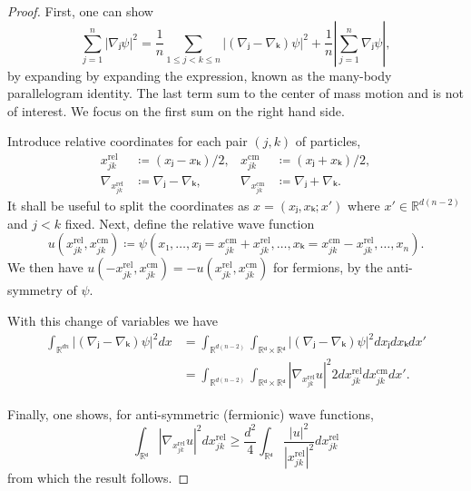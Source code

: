 \begin{proof}
  First, one can show
  \begin{equation}
    ∑_{j=1}^n |∇ⱼ ψ|^2 = \frac{1}{n} ∑_{1 \le j < k \le n} \left| (∇ⱼ - ∇ₖ) ψ \right|^2 + \frac{1}{n} \left| ∑_{j=1}^n ∇ⱼ ψ \right|,
  \end{equation}
  by expanding by expanding the expression, known as the many-body parallelogram identity. The last term sum to the center of mass motion and is not of interest. We focus on the first sum on the right hand side.

  Introduce relative coordinates for each pair $(j,k)$ of particles,
  \begin{equation}
    \begin{aligned}
      x_{jk}^\text{rel} &≔ (xⱼ - xₖ)/2, & x_{jk}^\text{cm} &≔ (xⱼ + xₖ)/2, \\
      ∇_{x_{jk}^\text{rel}} &≔ ∇ⱼ - ∇ₖ, & ∇_{x_{jk}^\text{cm}} &≔ ∇ⱼ + ∇ₖ.
    \end{aligned}
  \end{equation}
  It shall be useful to split the coordinates as $x = (xⱼ, xₖ; x')$ where $x' ∈ ℝ^{d(n-2)}$ and $j < k$ fixed. Next, define the relative wave function
  \begin{equation}
    u(x_{jk}^\text{rel}, x_{jk}^\text{cm}) ≔ ψ(x₁, …, xⱼ=x_{jk}^\text{cm}+x_{jk}^\text{rel}, …, xₖ = x_{jk}^\text{cm}-x_{jk}^\text{rel}, …, x_n).
  \end{equation}
  We then have $u(-x_{jk}^\text{rel}, x_{jk}^\text{cm}) = -u(x_{jk}^\text{rel}, x_{jk}^\text{cm})$ for fermions, by the anti-symmetry of $ψ$.

  With this change of variables we have
  \begin{equation}
    \begin{aligned}
      ∫_{ℝ^{dn}} \left|(∇ⱼ-∇ₖ)ψ\right|^2 dx
      &= ∫_{ℝ^{d(n-2)}} ∫_{ℝᵈ \times ℝᵈ} \left|(∇ⱼ-∇ₖ)ψ\right|^2 dxⱼdxₖdx' \\
      &= ∫_{ℝ^{d(n-2)}} ∫_{ℝᵈ \times ℝᵈ} \left|∇_{x_{jk}^\text{rel}}u\right|^2  2 dx_{jk}^\text{rel}dx_{jk}^\text{cm} dx'.
    \end{aligned}
  \end{equation}

  Finally, one shows, for anti-symmetric (fermionic) wave functions,
  \begin{equation}
    ∫_{ℝᵈ} \left|∇_{x_{jk}^\text{rel}} u \right|^2 dx_{jk}^\text{rel} \ge \frac{d^2}{4} ∫_{ℝᵈ} \frac{|u|^2}{|x_{jk}^\text{rel}|^2} dx_{jk}^\text{rel}
  \end{equation}
  from which the result follows.
\end{proof}

